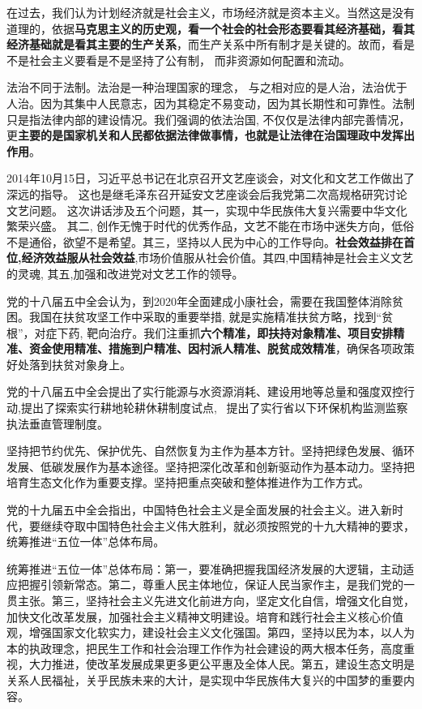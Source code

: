 {在过去，我们认为计划经济就是社会主义，市场经济就是资本主义。当然这是没有道理的，依据}\textbf{{马克思主义的历史观，看一个社会的社会形态要看其经济基础，看其经济基础就是看其主要的生产关系}}{，而生产关系中所有制才是关键的。故而，看是不是社会主义要看是不是坚持了公有制，
而非资源如何配置和流动。}

{法治不同于法制。法治是一种治理国家的理念，
与之相对应的是人治，法治优于人治。因为其集中人民意志，因为其稳定不易变动，因为其长期性和可靠性。法制只是指法律}{内部的建设情况。我们强调的依法治国,
不仅仅是法律内部完善情况，更}\textbf{{主要的是国家机关和人民都依据法律做事情，也就是让法律在治国理政中发挥出作用}}{。}

{2014年10月15日，习近平总书记在北京召开文艺座谈会，对文化和文艺工作做出了深远的指导。
这也是继毛泽东召开延安文艺座谈会后我党第二次高规格研究讨论文艺问题。
这次讲话涉及五个问题，其一，实现中华民族伟大复兴需要中华文化繁荣兴盛。
其二,
创作无愧于时代的优秀作品，文艺不能在市场中迷失方向，低俗不是通俗，欲望不是希望。其三，坚持以人民为中心的工作导向。}\textbf{{社会效益排在首位,经济效益服从社会效益}}{,市场价值服从社会价值。其四,中国精神是社会主义文艺的灵魂,
其五,加强和改进党对文艺工作的领导。}

{党的十八届五中全会认为，到2020年全面建成小康社会，需要在我国整体消除贫困。我国在扶贫攻坚工作中采取的重要举措,
就是实施精准扶贫方略，找到``贫根''，对症下药,
靶向治疗。我们注重抓}\textbf{{六个精准，即扶持对象精准、项目安排精准、资金使用精准、措施到户精准、因村派人精准、脱贫成效精准}}{，确保各项政策好处落到扶贫对象身上。~}

{党的十八届五中全会提出了实行能源与水资源消耗、建设用地等总量和强度双控行动,提出了探索实行耕地轮耕休耕制度试点,
~提出了实行省以下环保机构监测监察执法垂直管理制度。}

{坚持把节约优先、保护优先、自然恢复为主作为基本方针。坚持把绿色发展、循环发展、低碳发展作为基本途径。坚持把深化改革和创新驱动作为基本动力。坚持把培育生态文化作为重要支撑。坚持把重点突破和整体推进作为工作方式。}

{党的十九届五中全会指出，中国特色社会主义是全面发展的社会主义。进入新时代，要继续夺取中国特色社会主义伟大胜利，就必须按照党的十九大精神的要求，统筹推进``五位一体''总体布局。}

统筹推进``五位一体''总体布局：第一，要准确把握我国经济发展的大逻辑，主动适应把握引领新常态。第二，尊重人民主体地位，保证人民当家作主，是我们党的一贯主张。第三，坚持社会主义先进文化前进方向，坚定文化自信，增强文化自觉，加快文化改革发展，加强社会主义精神文明建设。培育和践行社会主义核心价值观，增强国家文化软实力，建设社会主义文化强国。第四，坚持以民为本，以人为本的执政理念，把民生工作和社会治理工作作为社会建设的两大根本任务，高度重视，大力推进，使改革发展成果更多更公平惠及全体人民。第五，建设生态文明是关系人民福祉，关乎民族未来的大计，是实现中华民族伟大复兴的中国梦的重要内容。\\
